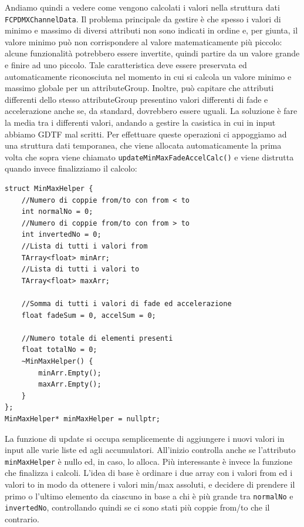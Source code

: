 \documentclass[main.tex]{subfiles}
\begin{document}
%
Andiamo quindi a vedere come vengono calcolati i valori nella struttura dati \lstinline{FCPDMXChannelData}. Il problema principale da gestire è che spesso i valori di minimo e massimo di diversi attributi non sono indicati in ordine e, per giunta, il valore minimo può non corrispondere al valore matematicamente più piccolo: alcune funzionalità potrebbero essere invertite, quindi partire da un valore grande e finire ad uno piccolo. Tale caratteristica deve essere preservata ed automaticamente riconosciuta nel momento in cui si calcola un valore minimo e massimo globale per un attributeGroup. Inoltre, può capitare che attributi differenti dello stesso attributeGroup presentino valori differenti di fade e accelerazione anche se, da standard, dovrebbero essere uguali. La soluzione è fare la media tra i differenti valori, andando a gestire la casistica in cui in input abbiamo GDTF mal scritti. Per effettuare queste operazioni ci appoggiamo ad una struttura dati temporanea, che viene allocata automaticamente la prima volta che sopra viene chiamato \lstinline{updateMinMaxFadeAccelCalc()} e viene distrutta quando invece finalizziamo il calcolo:
\begin{lstlisting}
struct MinMaxHelper {
    //Numero di coppie from/to con from < to
    int normalNo = 0;
    //Numero di coppie from/to con from > to
    int invertedNo = 0;
    //Lista di tutti i valori from
    TArray<float> minArr;
    //Lista di tutti i valori to
    TArray<float> maxArr;

    //Somma di tutti i valori di fade ed accelerazione
    float fadeSum = 0, accelSum = 0;

    //Numero totale di elementi presenti
    float totalNo = 0;
    ~MinMaxHelper() {
        minArr.Empty();
        maxArr.Empty();
    }
};
MinMaxHelper* minMaxHelper = nullptr;
\end{lstlisting}
La funzione di update si occupa semplicemente di aggiungere i nuovi valori in input alle varie liste ed agli accumulatori. All'inizio controlla anche se l'attributo \lstinline{minMaxHelper} è nullo ed, in caso, lo alloca. Più interessante è invece la funzione che finalizza i calcoli. L'idea di base è ordinare i due array con i valori from ed i valori to in modo da ottenere i valori min/max assoluti, e decidere di prendere il primo o l'ultimo elemento da ciascuno in base a chi è più grande tra \lstinline{normalNo} e \lstinline{invertedNo}, controllando quindi se ci sono stati più coppie from/to  che il contrario.
\end{document}
